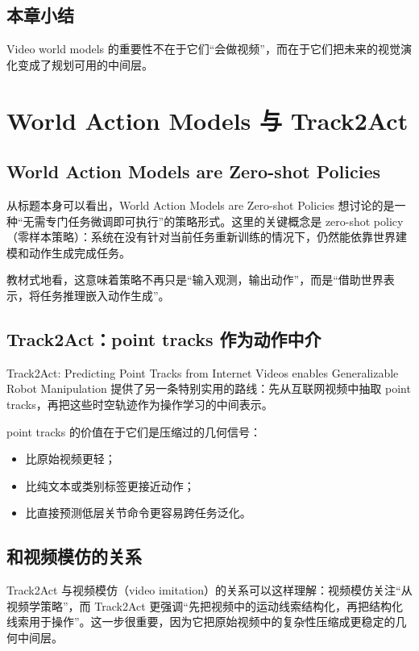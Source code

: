 \documentclass[a4paper]{article}
\begin{document}
\subsection{本章小结}

Video world models 的重要性不在于它们“会做视频”，而在于它们把未来的视觉演化变成了规划可用的中间层。

\section{World Action Models 与 Track2Act}

\subsection{World Action Models are Zero-shot Policies}

从标题本身可以看出，World Action Models are Zero-shot Policies 想讨论的是一种“无需专门任务微调即可执行”的策略形式。这里的关键概念是 zero-shot policy（零样本策略）：系统在没有针对当前任务重新训练的情况下，仍然能依靠世界建模和动作生成完成任务。

教材式地看，这意味着策略不再只是“输入观测，输出动作”，而是“借助世界表示，将任务推理嵌入动作生成”。

\subsection{Track2Act：point tracks 作为动作中介}

Track2Act: Predicting Point Tracks from Internet Videos enables Generalizable Robot Manipulation 提供了另一条特别实用的路线：先从互联网视频中抽取 point tracks，再把这些时空轨迹作为操作学习的中间表示。

point tracks 的价值在于它们是压缩过的几何信号：
\begin{itemize}
  \item 比原始视频更轻；
  \item 比纯文本或类别标签更接近动作；
  \item 比直接预测低层关节命令更容易跨任务泛化。
\end{itemize}

\subsection{和视频模仿的关系}

Track2Act 与视频模仿（video imitation）的关系可以这样理解：视频模仿关注“从视频学策略”，而 Track2Act 更强调“先把视频中的运动线索结构化，再把结构化线索用于操作”。这一步很重要，因为它把原始视频中的复杂性压缩成更稳定的几何中间层。
\end{document}

